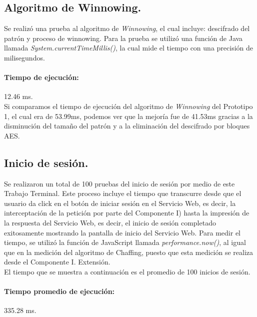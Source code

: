 \documentclass[12pt, a4paper, titlepage]{report}
\begin{document}
	        \subsection{Algoritmo de Winnowing.}
	        
	            Se realizó una prueba al algoritmo de \textit{Winnowing}, el cual incluye: descifrado del patrón y proceso de winnowing. Para la prueba se utilizó una función de Java llamada \textit{System.currentTimeMillis()}, la cual mide el tiempo con una precisión de milisegundos.\\
	            
	            \paragraph{Tiempo de ejecución: } 12.46 ms.\\
	            
	            Si comparamos el tiempo de ejecución del algoritmo de \textit{Winnowing} del Prototipo 1, el cual era de 53.99ms, podemos ver que la mejoría fue de 41.53ms gracias a la disminución del tamaño del patrón y a la eliminación del descifrado por bloques AES.
	        
	        \subsection{Inicio de sesión.}
	    
	            Se realizaron un total de 100 pruebas del inicio de sesión por medio de este Trabajo Terminal. Este proceso incluye el tiempo que transcurre desde que el usuario da click en el botón de iniciar sesión en el Servicio Web, es decir, la interceptación de la petición por parte del Componente I) hasta la impresión de la respuesta del Servicio Web, es decir, el inicio de sesión completado exitosamente mostrando la pantalla de inicio del Servicio Web.
	            Para medir el tiempo, se utilizó la función de JavaScript llamada \textit{performance.now()}, al igual que en la medición del algoritmo de Chaffing, puesto que esta medición se realiza desde el Componente I. Extensión.\\
	            El tiempo que se muestra a continuación es el promedio de 100 inicios de sesión.
	            
	            \paragraph{Tiempo promedio de ejecución: } 335.28 ms.\\
	            
\end{document}
